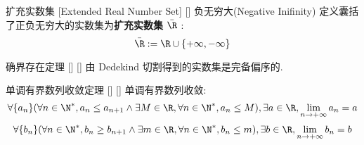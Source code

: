 \documentclass[UTF8]{ctexart}
\begin{document}
			\fi
			
			\begin{dfn}
			    []
			    {扩充实数集 }
			    [Extended Real Number Set]
			    []
			{}
			{负无穷大(Negative Inifinity)}
			{}
			{}
				定义囊括了正负无穷大的实数集为\textbf{扩充实数集} \(\bar\R\) : 
				\[\bar\R:=\R\cup\{+\infty,-\infty\}\]

				\iffalse

				规定 \(\bar\R\) 内的广义四则运算如下: 
				\[\begin{cases}
					\forall x\in\R, x+(+\infty)=x-(-\infty)=+\infty\\
					\forall x\in\R, x+(-\infty)=x-(+\infty)=-\infty\\
					(+\infty)+(+\infty)=(+\infty)-(-\infty)=+\infty\\
					(-\infty)+(-\infty)=(-\infty)-(+\infty)=-\infty\\
				\end{cases}\]
				\[\begin{cases}
					\forall x\in\R^+, x\cdot(+\infty)=x-(-\infty)=+\infty\\
					\forall x\in\R, x+(-\infty)=x-(+\infty)=-\infty\\
					(+\infty)+(+\infty)=(+\infty)-(-\infty)=+\infty\\
					(-\infty)+(-\infty)=(-\infty)-(+\infty)=-\infty\\
				\end{cases}\]

				\fi
			\end{dfn}
		
			\begin{thm}
			    []
			    {确界存在定理}
			    []
			    []
				由 Dedekind 切割得到的实数集是完备偏序的. 
			\end{thm}

			\begin{prf}

			\end{prf}
			
			\begin{thm}
			    []
			    {单调有界数列收敛定理}
			    []
			    []
				单调有界数列收敛: 
				\[\forall\{a_n\}(\forall n\in\N^*, a_n\leq a_{n+1}\wedge\exists M\in\R, \forall n\in\N^*, a_n\leq M), \exists a\in\R, \lim_{n\to+\infty}a_n=a\] 
				\[\forall\{b_n\}(\forall n\in\N^*, b_n\geq b_{n+1}\wedge\exists m\in\R, \forall n\in\N^*, b_n\leq m), \exists b\in\R, \lim_{n\to+\infty}b_n=b\]
			\end{thm}
			
\end{document}
